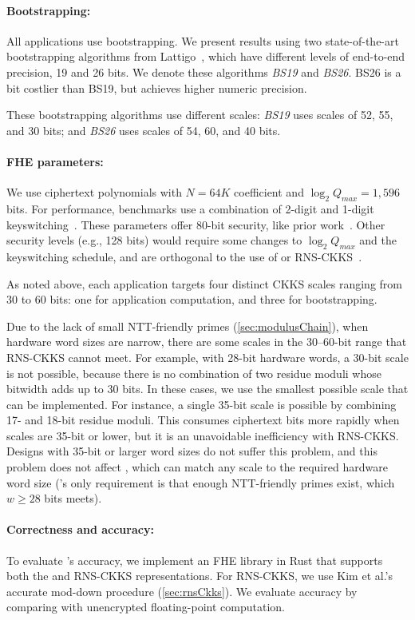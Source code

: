 \paragraph{Bootstrapping:}
All applications use bootstrapping.
We present results using two state-of-the-art bootstrapping algorithms from
Lattigo~\cite{lattigo-github}, which have different levels of end-to-end
precision, 19 and 26 bits. We denote these algorithms \emph{BS19} and \emph{BS26}.
BS26 is a bit costlier than BS19, but achieves higher numeric precision.

These bootstrapping algorithms use different scales: \emph{BS19} uses scales of 52, 55, and 30
bits; and \emph{BS26} uses scales of 54, 60, and 40 bits.

\paragraph{FHE parameters:}
We use ciphertext polynomials with $N=64K$ coefficient and $\log_2Q_{max}=1,596$
bits.
For performance, benchmarks use a combination of 2-digit and 1-digit
keyswitching~\cite{samardzic:isca22:craterlake,halevi2020helib,gentry:crypto2012:homomorphic}.
These parameters offer 80-bit security, like prior
work~\cite{samardzic:isca22:craterlake}.
Other security levels (e.g., 128 bits) would require some changes to $\log_2Q_{max}$
and the keyswitching schedule, and are orthogonal to the use of \name or
RNS-CKKS~\cite{samardzic:isca22:craterlake}.

As noted above, each application targets four distinct CKKS scales ranging from
30 to 60 bits: one for application computation, and three for bootstrapping.

Due to the lack of small NTT-friendly primes (\autoref{sec:modulusChain}), when
hardware word sizes are narrow,
there are some scales in the 30--60-bit range that RNS-CKKS cannot meet.
For example, with 28-bit hardware words, a 30-bit scale is not possible,
because there is no combination of two residue moduli whose bitwidth adds up to
30 bits.
In these cases, we use the smallest possible scale that can be implemented.
For instance, a single 35-bit scale is possible by combining 17- and 18-bit
residue moduli.
This consumes ciphertext bits more rapidly when scales are 35-bit or lower, but
it is an unavoidable inefficiency with RNS-CKKS.
Designs with 35-bit or larger word sizes do not suffer this problem, and this
problem does not affect \name, which can match any scale to the required hardware word
size (\name's only requirement is that enough NTT-friendly primes exist, which $w \geq 28$ bits meets).

\figMain %

\paragraph{Correctness and accuracy:}
To evaluate \name's accuracy, we implement an FHE library in Rust that supports
both the \name and RNS-CKKS representations.
For RNS-CKKS, we use Kim et al.'s~\cite{kim2022approximate} accurate mod-down
procedure (\autoref{sec:rnsCkks}).
We evaluate accuracy by comparing with unencrypted floating-point computation.

